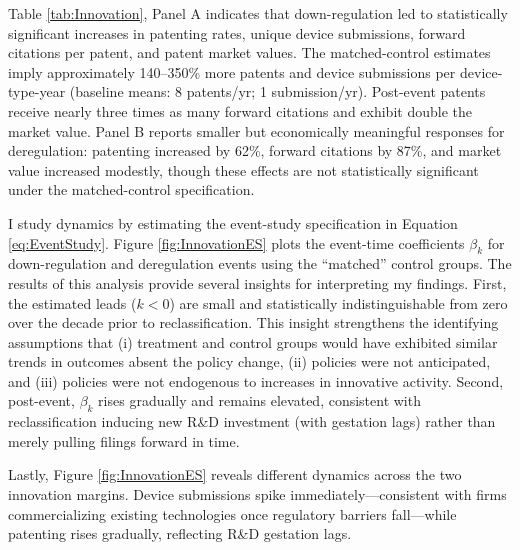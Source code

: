 \documentclass[letterpaper,12pt]{article}
\theoremstyle{definition}
\begin{document}
Table \ref{tab:Innovation}, Panel A indicates that down-regulation led to statistically significant increases in patenting rates, unique device submissions, forward citations per patent, and patent market values. The matched-control estimates imply approximately 140--350\% more patents and device submissions per device-type-year (baseline means: 8 patents/yr; 1 submission/yr). Post-event patents receive nearly three times as many forward citations and exhibit double the market value. Panel B reports smaller but economically meaningful responses for deregulation: patenting increased by 62\%, forward citations by 87\%, and market value increased modestly, though these effects are not statistically significant under the matched-control specification.


I study dynamics by estimating the event-study specification in Equation \ref{eq:EventStudy}. Figure \ref{fig:InnovationES} plots the event-time coefficients $\beta_{k}$ for down-regulation and deregulation events using the ``matched'' control groups. The results of this analysis provide several insights for interpreting my findings. First, the estimated leads ($k<0$) are small and statistically indistinguishable from zero over the decade prior to reclassification. This insight strengthens the identifying assumptions that (i) treatment and control groups would have exhibited similar trends in outcomes absent the policy change,\footnotemark {} (ii) policies were not anticipated, and (iii) policies were not endogenous to increases in innovative activity. Second, post-event, $\beta_k$ rises gradually and remains elevated, consistent with reclassification inducing new R\&D investment (with gestation lags) rather than merely pulling filings forward in time.

  

Lastly, Figure \ref{fig:InnovationES} reveals different dynamics across the two innovation margins. Device submissions spike immediately---consistent with firms commercializing existing technologies once regulatory barriers fall---while patenting rises gradually, reflecting R\&D gestation lags.\footnotemark {}
\end{document}
